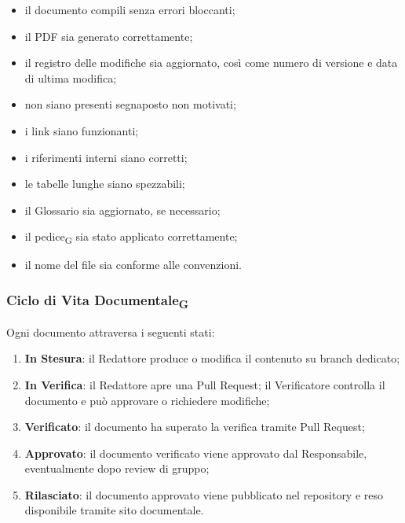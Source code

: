 \begin{itemize}
    \item il documento compili senza errori bloccanti;
    \item il PDF sia generato correttamente;
    \item il registro delle modifiche sia aggiornato, così come numero di versione e data di ultima modifica;
    \item non siano presenti segnaposto non motivati;
    \item i link siano funzionanti;
    \item i riferimenti interni siano corretti;
    \item le tabelle lunghe siano spezzabili;
    \item il Glossario sia aggiornato, se necessario;
    \item il pedice\textsubscript{G} sia stato applicato correttamente;
    \item il nome del file sia conforme alle convenzioni.
\end{itemize}


\subsubsection{Ciclo di Vita Documentale\textsubscript{G}}
\label{sec:ciclo-vita}

Ogni documento attraversa i seguenti stati:

\begin{enumerate}
    \item \textbf{In Stesura}: il Redattore produce o modifica il contenuto su branch
    dedicato;

    \item \textbf{In Verifica}: il Redattore apre una Pull Request; il Verificatore
    controlla il documento e può approvare o richiedere modifiche;

    \item \textbf{Verificato}: il documento ha superato la verifica tramite Pull Request;

    \item \textbf{Approvato}: il documento verificato viene approvato dal Responsabile,
    eventualmente dopo review di gruppo;

    \item \textbf{Rilasciato}: il documento approvato viene pubblicato nel repository
    e reso disponibile tramite sito documentale.
\end{enumerate}

